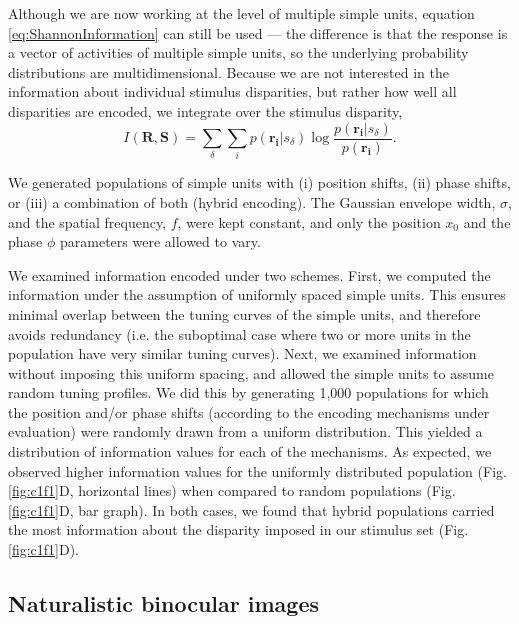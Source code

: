 Although we are now working at the level of multiple simple units, equation \ref{eq:ShannonInformation} can still be used --- the difference is that the response is a vector of activities of multiple simple units, so the underlying probability distributions are multidimensional. Because we are not interested in the information about individual stimulus disparities, but rather how well all disparities are encoded, we integrate over the stimulus disparity,
\begin{equation}
  I(\mathbf{R}, \mathbf{S}) = \sum_\delta \sum_i p(\mathbf{r_i}|s_\delta) \log \frac{p(\mathbf{r_i}|s_\delta)}{p(\mathbf{r_i})}.
  \label{eq:ShannonInformationVector}
\end{equation}

We generated populations of simple units with (i) position shifts, (ii) phase shifts, or (iii) a combination of both (hybrid encoding). The Gaussian envelope width, $\sigma$, and the spatial frequency, $f$, were kept constant, and only the position $x_0$ and the phase $\phi$ parameters were allowed to vary. 

We examined information encoded under two schemes. First, we computed the information under the assumption of uniformly spaced simple units. This ensures minimal overlap between the tuning curves of the simple units, and therefore avoids redundancy (i.e. the suboptimal case where two or more units in the population have very similar tuning curves). Next, we examined information without imposing this uniform spacing, and allowed the simple units to assume random tuning profiles. We did this by generating 1,000 populations for which the position and/or phase shifts (according to the encoding mechanisms under evaluation) were randomly drawn from a uniform distribution. This yielded a distribution of information values for each of the mechanisms. As expected, we observed higher information values for the uniformly distributed population (Fig. \ref{fig:c1f1}D, horizontal lines) when compared to random populations (Fig. \ref{fig:c1f1}D, bar graph). In both cases, we found that hybrid populations carried the most information about the disparity imposed in our stimulus set (Fig. \ref{fig:c1f1}D).

\subsection*{Naturalistic binocular images}

